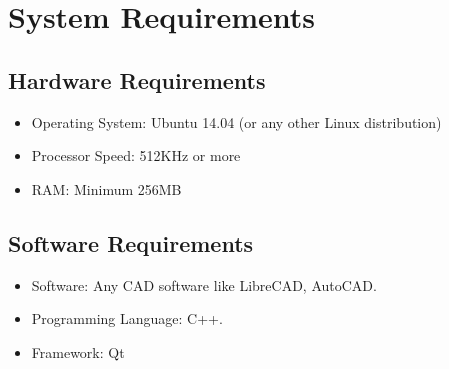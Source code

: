 \section{System Requirements}
\subsection{Hardware Requirements}
\begin{itemize}
\item Operating System: Ubuntu 14.04 (or any other Linux distribution)
\item Processor Speed: 512KHz or more
\item RAM: Minimum 256MB
\end{itemize}
\subsection{Software Requirements}
\begin{itemize}
\item Software: Any CAD software like LibreCAD, AutoCAD.
\item Programming Language: C++.
\item Framework: Qt
\end{itemize}
